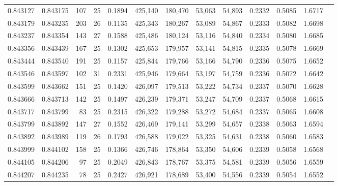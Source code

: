 \begin{tabular}{rrrrrrrrrrrrr}
0.843127 & 0.843175 &   107 &  25 &                                     0.1894 & 425,140 & 180,470 &  53,063 &  54,893 & 0.2332 & 0.5085 & 1.6717 \\
0.843179 & 0.843235 &   203 &  26 &                                     0.1135 & 425,343 & 180,267 &  53,089 &  54,867 & 0.2333 & 0.5082 & 1.6698 \\
0.843237 & 0.843354 &   143 &  27 &                                     0.1588 & 425,486 & 180,124 &  53,116 &  54,840 & 0.2334 & 0.5080 & 1.6685 \\
0.843356 & 0.843439 &   167 &  25 &                                     0.1302 & 425,653 & 179,957 &  53,141 &  54,815 & 0.2335 & 0.5078 & 1.6669 \\
0.843444 & 0.843540 &   191 &  25 &                                     0.1157 & 425,844 & 179,766 &  53,166 &  54,790 & 0.2336 & 0.5075 & 1.6652 \\
0.843546 & 0.843597 &   102 &  31 &                                     0.2331 & 425,946 & 179,664 &  53,197 &  54,759 & 0.2336 & 0.5072 & 1.6642 \\
0.843599 & 0.843662 &   151 &  25 &                                     0.1420 & 426,097 & 179,513 &  53,222 &  54,734 & 0.2337 & 0.5070 & 1.6628 \\
0.843666 & 0.843713 &   142 &  25 &                                     0.1497 & 426,239 & 179,371 &  53,247 &  54,709 & 0.2337 & 0.5068 & 1.6615 \\
0.843717 & 0.843799 &    83 &  25 &                                     0.2315 & 426,322 & 179,288 &  53,272 &  54,684 & 0.2337 & 0.5065 & 1.6608 \\
0.843799 & 0.843892 &   147 &  27 &                                     0.1552 & 426,469 & 179,141 &  53,299 &  54,657 & 0.2338 & 0.5063 & 1.6594 \\
0.843892 & 0.843989 &   119 &  26 &                                     0.1793 & 426,588 & 179,022 &  53,325 &  54,631 & 0.2338 & 0.5060 & 1.6583 \\
0.843999 & 0.844102 &   158 &  25 &                                     0.1366 & 426,746 & 178,864 &  53,350 &  54,606 & 0.2339 & 0.5058 & 1.6568 \\
0.844105 & 0.844206 &    97 &  25 &                                     0.2049 & 426,843 & 178,767 &  53,375 &  54,581 & 0.2339 & 0.5056 & 1.6559 \\
0.844207 & 0.844235 &    78 &  25 &                                     0.2427 & 426,921 & 178,689 &  53,400 &  54,556 & 0.2339 & 0.5054 & 1.6552 \\

\end{tabular}

